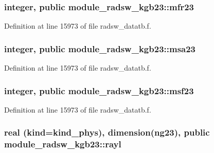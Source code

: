 \subsubsection[{\texorpdfstring{mfr23}{mfr23}}]{\setlength{\rightskip}{0pt plus 5cm}integer, public module\+\_\+radsw\+\_\+kgb23\+::mfr23}\hypertarget{namespacemodule__radsw__kgb23_a78b43ec4bc2afd4f520480a8410d9df5}{}\label{namespacemodule__radsw__kgb23_a78b43ec4bc2afd4f520480a8410d9df5}


Definition at line 15973 of file radsw\+\_\+datatb.\+f.

\subsubsection[{\texorpdfstring{msa23}{msa23}}]{\setlength{\rightskip}{0pt plus 5cm}integer, public module\+\_\+radsw\+\_\+kgb23\+::msa23}\hypertarget{namespacemodule__radsw__kgb23_a744e7ef73b8d3cc01ff9c6a6010d95d7}{}\label{namespacemodule__radsw__kgb23_a744e7ef73b8d3cc01ff9c6a6010d95d7}


Definition at line 15973 of file radsw\+\_\+datatb.\+f.

\subsubsection[{\texorpdfstring{msf23}{msf23}}]{\setlength{\rightskip}{0pt plus 5cm}integer, public module\+\_\+radsw\+\_\+kgb23\+::msf23}\hypertarget{namespacemodule__radsw__kgb23_ab96959c26232963a568609451483843e}{}\label{namespacemodule__radsw__kgb23_ab96959c26232963a568609451483843e}


Definition at line 15973 of file radsw\+\_\+datatb.\+f.

\subsubsection[{\texorpdfstring{rayl}{rayl}}]{\setlength{\rightskip}{0pt plus 5cm}real (kind=kind\+\_\+phys), dimension(ng23), public module\+\_\+radsw\+\_\+kgb23\+::rayl}\hypertarget{namespacemodule__radsw__kgb23_a40006f284543c7347eced417b9de2fc6}{}\label{namespacemodule__radsw__kgb23_a40006f284543c7347eced417b9de2fc6}


